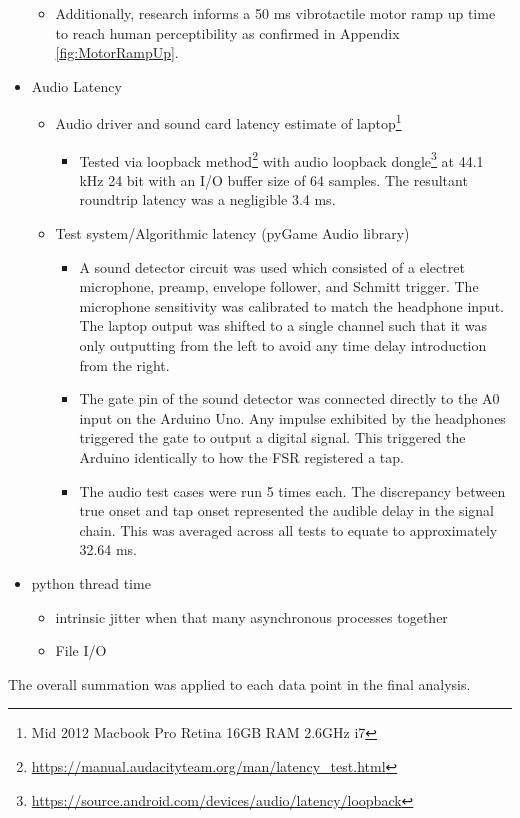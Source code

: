 \begin{itemize}
\begin{itemize}
        \item Additionally, research informs a 50 ms vibrotactile motor ramp up time to reach human perceptibility as confirmed in Appendix \ref{fig:MotorRampUp}.
    \end{itemize}
    \item Audio Latency
    \begin{itemize}
        \item Audio driver and sound card latency estimate of laptop\footnote{Mid 2012 Macbook Pro Retina 16GB RAM 2.6GHz i7}
        \begin{itemize}
            \item Tested via loopback method\footnote{\url{https://manual.audacityteam.org/man/latency_test.html}} with audio loopback dongle\footnote{\url{https://source.android.com/devices/audio/latency/loopback}} at 44.1 kHz 24 bit with an I/O buffer size of 64 samples. The resultant roundtrip latency was a negligible 3.4 ms.
        \end{itemize}
        \item Test system/Algorithmic latency (pyGame Audio library)
        \begin{itemize}
            \item A sound detector circuit was used which consisted of a electret microphone, preamp, envelope follower, and Schmitt trigger. The microphone sensitivity was calibrated to match the headphone input. The laptop output was shifted to a single channel such that it was only outputting from the left to avoid any time delay introduction from the right. \item The gate pin of the sound detector was connected directly to the A0 input on the Arduino Uno. Any impulse exhibited by the headphones triggered the gate to output a digital signal. This triggered the Arduino identically to how the FSR registered a tap. 
            \item The audio test cases were run 5 times each. The discrepancy between true onset and tap onset represented the audible delay in the signal chain. This was averaged across all tests to equate to approximately 32.64 ms.
        \end{itemize}
    \end{itemize}
    \item python thread time
        \begin{itemize}
            \item intrinsic jitter when that many asynchronous processes together
            \item File I/O
        \end{itemize}
\end{itemize}
The overall summation was applied to each data point in the final analysis.